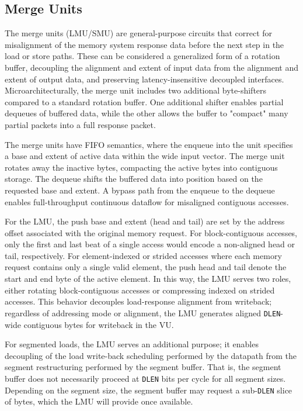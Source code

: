 \newpage
\subsection{Merge Units}



The merge units (LMU/SMU) are general-purpose circuits that correct for misalignment of the memory system response data before the next step in the load or store paths.
These can be considered a generalized form of a rotation buffer, decoupling the alignment and extent of input data from the alignment and extent of output data, and preserving latency-insensitive decoupled interfaces.
Microarchitecturally, the merge unit includes two additional byte-shifters compared to a standard rotation buffer.
One additional shifter enables partial dequeues of buffered data, while the other allows the buffer to "compact" many partial packets into a full response packet.

The merge units have FIFO semantics, where the enqueue into the unit specifies a base and extent of active data within the wide input vector.
The merge unit rotates away the inactive bytes, compacting the active bytes into contiguous storage.
The dequeue shifts the buffered data into position based on the requested base and extent.
A bypass path from the enqueue to the dequeue enables full-throughput continuous dataflow for misaligned contiguous accesses.

For the LMU, the push base and extent (head and tail) are set by the address offset associated with the original memory request.
For block-contiguous accesses, only the first and last beat of a single access would encode a non-aligned head or tail, respectively.
For element-indexed or strided accesses where each memory request contains only a single valid element, the push head and tail denote the start and end byte of the active element.
In this way, the LMU serves two roles, either rotating block-contiguous accesses or compressing indexed on strided accesses.
This behavior decouples load-response alignment from writeback; regardless of addressing mode or alignment, the LMU generates aligned \texttt{DLEN}-wide contiguous bytes for writeback in the VU.

For segmented loads, the LMU serves an additional purpose; it enables decoupling of the load write-back scheduling performed by the datapath from the segment restructuring performed by the segment buffer.
That is, the segment buffer does not necessarily proceed at \texttt{DLEN} bits per cycle for all segment sizes.
Depending on the segment size, the segment buffer may request a sub-\texttt{DLEN} slice of bytes, which the LMU will provide once available.


